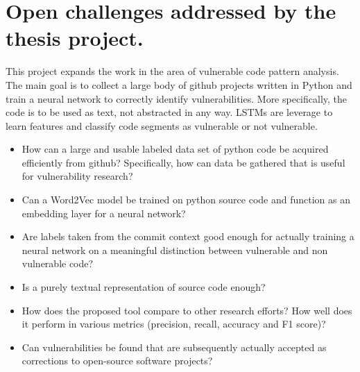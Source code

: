 \documentclass[
	a4paper,
	pagesize,
	pdftex,
	12pt,
	twoside, %
	BCOR=5mm, %
	ngerman,
	fleqn,
	final,
	]{scrartcl}
\begin{document}
\section{Open challenges addressed by the thesis project.}

This project expands the work in the area of vulnerable code pattern analysis. The main goal is to collect a large body of github projects written in Python and train a neural network to correctly identify vulnerabilities. More specifically, the code is to be used as text, not abstracted in any way. LSTMs are leverage to learn features and classify code segments as vulnerable or not vulnerable. 

\begin{itemize} 
	\item How can a large and usable labeled data set of python code be acquired efficiently from github? Specifically, how can data be gathered that is useful for vulnerability research?
	\item Can a Word2Vec model be trained on python source code and function as an embedding layer for a neural network?
	\item Are labels taken from the commit context good enough for actually training a neural network on a meaningful distinction between vulnerable and non vulnerable code?
	\item Is a purely textual representation of source code enough? %
	\item How does the proposed tool compare to other research efforts? How well does it perform in various metrics (precision, recall, accuracy and F1 score)?
	\item Can vulnerabilities be found that are subsequently actually accepted as corrections to open-source software projects?
\end{itemize}
\end{document}
